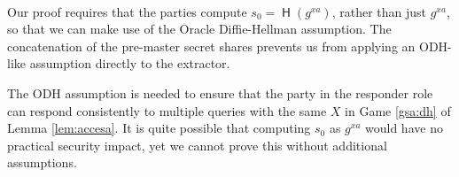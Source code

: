 \documentclass[USenglish,oneside,twocolumn]{article}
\theoremstyle{dgthm}
\theoremstyle{dgdef}
\newcommand{\hybrid}{{\sf {hybrid}}}
\newcommand{\TODO}[1]{{\bf#1}}
\newcommand{\AlgorithmName}[1]{\operatorname{\mathsf{#1}}}
\newcommand{\Hash}{\AlgorithmName{H}}
\newcommand{\Oracle}[1]{\mathcal #1}
\newcommand{\AdvInt}[1]{\mathsf{#1}}
\newcommand{\Send}{\AdvInt{Send}}
\begin{document}




    \\
      Our proof requires that the parties compute $s_0 = \Hash(g^{xa})$, rather
      than just $g^{xa}$, so that we can make use of the Oracle Diffie-Hellman
      assumption. The concatenation of the pre-master secret shares prevents us
      from applying an ODH-like assumption directly to the extractor.

      The ODH assumption is needed to ensure that the party in the responder
      role can respond consistently to multiple queries with the same $X$ in
      Game \ref{gsa:dh} of Lemma \ref{lem:accesa}. It is quite possible that
      computing $s_0$ as $g^{xa}$ would have no practical security
      impact, yet we cannot prove this without additional assumptions.\\
\end{document}
